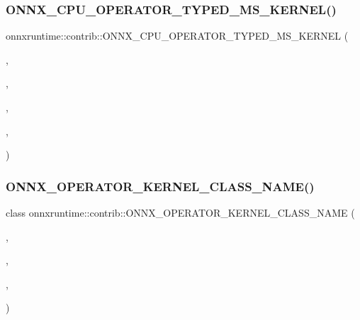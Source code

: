 \subsubsection{\texorpdfstring{O\+N\+N\+X\+\_\+\+C\+P\+U\+\_\+\+O\+P\+E\+R\+A\+T\+O\+R\+\_\+\+T\+Y\+P\+E\+D\+\_\+\+M\+S\+\_\+\+K\+E\+R\+N\+E\+L()}{ONNX\_CPU\_OPERATOR\_TYPED\_MS\_KERNEL()}\hspace{0.1cm}{\footnotesize\ttfamily [3/3]}}
{\footnotesize\ttfamily onnxruntime\+::contrib\+::\+O\+N\+N\+X\+\_\+\+C\+P\+U\+\_\+\+O\+P\+E\+R\+A\+T\+O\+R\+\_\+\+T\+Y\+P\+E\+D\+\_\+\+M\+S\+\_\+\+K\+E\+R\+N\+EL (\begin{DoxyParamCaption}\item[{\mbox{\hyperlink{classonnxruntime_1_1contrib_1_1IsNaN}{Is\+NaN}}}]{,  }\item[{1}]{,  }\item[{float}]{,  }\item[{\mbox{\hyperlink{classonnxruntime_1_1KernelDefBuilder}{Kernel\+Def\+Builder}}() .Type\+Constraint(\char`\"{}T1\char`\"{}, Data\+Type\+Impl\+::\+Get\+Tensor\+Type$<$ float $>$()) .Type\+Constraint(\char`\"{}T2\char`\"{}, Data\+Type\+Impl\+::\+Get\+Tensor\+Type$<$ bool $>$())}]{,  }\item[{\mbox{\hyperlink{classonnxruntime_1_1contrib_1_1IsNaN}{contrib\+::\+Is\+NaN}}$<$ float $>$}]{ }\end{DoxyParamCaption})}

\mbox{\label{namespaceonnxruntime_1_1contrib_a27e2b17db8575028ac91e6bc196cceed}} 
\subsubsection{\texorpdfstring{O\+N\+N\+X\+\_\+\+O\+P\+E\+R\+A\+T\+O\+R\+\_\+\+K\+E\+R\+N\+E\+L\+\_\+\+C\+L\+A\+S\+S\+\_\+\+N\+A\+M\+E()}{ONNX\_OPERATOR\_KERNEL\_CLASS\_NAME()}}
{\footnotesize\ttfamily class onnxruntime\+::contrib\+::\+O\+N\+N\+X\+\_\+\+O\+P\+E\+R\+A\+T\+O\+R\+\_\+\+K\+E\+R\+N\+E\+L\+\_\+\+C\+L\+A\+S\+S\+\_\+\+N\+A\+ME (\begin{DoxyParamCaption}\item[{\mbox{\hyperlink{namespaceonnxruntime_a394a3c7e50622de1f203a96df592060d}{k\+Cpu\+Execution\+Provider}}}]{,  }\item[{\mbox{\hyperlink{namespaceonnxruntime_a1e63b08774e23395d961e8e35fb62db1}{k\+M\+S\+Domain}}}]{,  }\item[{1}]{,  }\item[{Attn\+L\+S\+TM}]{ }\end{DoxyParamCaption})}

